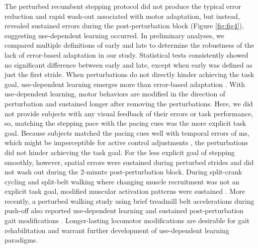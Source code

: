 \documentclass[../thesis_seyed.tex]{subfiles}
\begin{document}
The perturbed recumbent stepping protocol did not produce the typical error reduction and rapid wash-out associated with motor adaptation, but instead, revealed sustained errors during the post-perturbation block (Figure \ref{fig:fig4}), suggesting use-dependent learning occurred. {In preliminary analyses, we compared multiple definitions of early and late to determine the robustness of the lack of error-based adaptation in our study. Statistical tests consistently showed no significant difference between early and late, except when early was defined as just the first stride.} When perturbations do not directly hinder achieving the task goal, use-dependent learning emerges more than error-based adaptation \cite{Diedrichsen2010-as}. With use-dependent learning, motor behaviors are modified in the direction of perturbation and sustained longer after removing the perturbations. Here, {we did not provide subjects with any visual feedback of their errors or task performance, so,} matching the stepping pace with the  pacing cues was the more explicit task goal. Because subjects matched the pacing cues well with temporal errors of  ms, which might be imperceptible for active control adjustments \cite{Carpenter1999-lb}, the perturbations did not hinder achieving the task goal. For the less explicit goal of stepping smoothly, however, spatial errors were sustained during perturbed strides and did not wash out during the 2-minute post-perturbation block. During split-crank cycling and split-belt walking where changing muscle recruitment was not an explicit task goal, modified muscular activation patterns were sustained \cite{Alibiglou2011-sc,Maclellan2014-vk}. More recently, a perturbed walking study using brief treadmill belt accelerations during push-off also reported use-dependent learning and sustained post-perturbation gait modifications \cite{Farrens2020-fb}. Longer-lasting locomotor modifications are desirable for gait rehabilitation and warrant further development of use-dependent learning paradigms.
\end{document}
